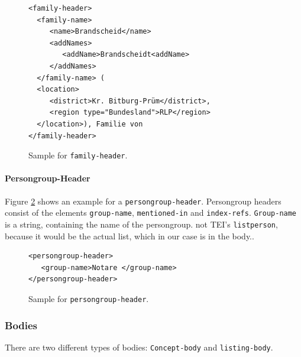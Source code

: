 \begin{figure}[H]
\begin{verbatim}
<family-header>
  <family-name>
     <name>Brandscheid</name>
     <addNames>
        <addName>Brandscheidt<addName>       
     </addNames>
  </family-name> (
  <location>
     <district>Kr. Bitburg-Prüm</district>, 
     <region type="Bundesland">RLP</region>
  </location>), Familie von 
</family-header>
\end{verbatim}
\label{fig:family-header-xml}
\caption{Sample for \texttt{family-header}.}
\end{figure}

\paragraph{Persongroup-Header}
Figure \ref{fig:persongroup-header-xml} shows an example for a \texttt{persongroup-header}. Persongroup headers consist of the elements \texttt{group-name}, \texttt{mentioned-in} and \texttt{index-refs}. \texttt{Group-name} is a string, containing the name of the persongroup.
not TEI's \texttt{listperson}, because it would be the actual list, which in our case is in the body..

\begin{figure}[H]
\begin{verbatim}
<persongroup-header>
   <group-name>Notare </group-name>
</persongroup-header>
\end{verbatim}
\label{fig:persongroup-header-xml}
\caption{Sample for \texttt{persongroup-header}.}
\end{figure}

\subsubsection{Bodies}
There are two different types of bodies: \texttt{Concept-body} and \texttt{listing-body}.

